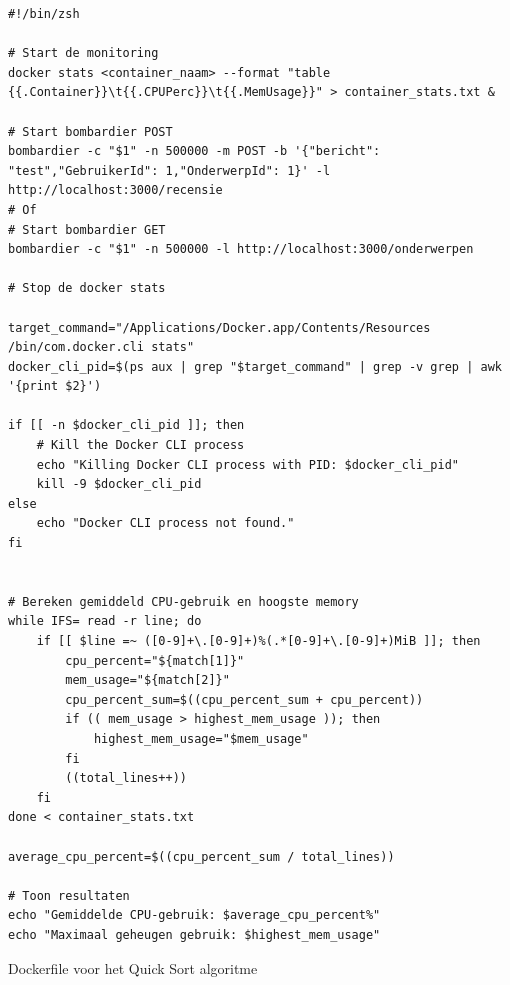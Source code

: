 \begin{listing}[H]
  \centering
  \begin{verbatim}
#!/bin/zsh

# Start de monitoring
docker stats <container_naam> --format "table {{.Container}}\t{{.CPUPerc}}\t{{.MemUsage}}" > container_stats.txt &

# Start bombardier POST
bombardier -c "$1" -n 500000 -m POST -b '{"bericht": "test","GebruikerId": 1,"OnderwerpId": 1}' -l http://localhost:3000/recensie
# Of
# Start bombardier GET
bombardier -c "$1" -n 500000 -l http://localhost:3000/onderwerpen

# Stop de docker stats

target_command="/Applications/Docker.app/Contents/Resources
/bin/com.docker.cli stats"
docker_cli_pid=$(ps aux | grep "$target_command" | grep -v grep | awk '{print $2}')

if [[ -n $docker_cli_pid ]]; then
    # Kill the Docker CLI process
    echo "Killing Docker CLI process with PID: $docker_cli_pid"
    kill -9 $docker_cli_pid
else
    echo "Docker CLI process not found."
fi


# Bereken gemiddeld CPU-gebruik en hoogste memory
while IFS= read -r line; do
    if [[ $line =~ ([0-9]+\.[0-9]+)%(.*[0-9]+\.[0-9]+)MiB ]]; then
        cpu_percent="${match[1]}"
        mem_usage="${match[2]}"
        cpu_percent_sum=$((cpu_percent_sum + cpu_percent))
        if (( mem_usage > highest_mem_usage )); then
            highest_mem_usage="$mem_usage"
        fi
        ((total_lines++))
    fi
done < container_stats.txt

average_cpu_percent=$((cpu_percent_sum / total_lines))

# Toon resultaten
echo "Gemiddelde CPU-gebruik: $average_cpu_percent%"
echo "Maximaal geheugen gebruik: $highest_mem_usage"

      \end{verbatim}
      \caption{\label{code:zshscript}Dockerfile voor het Quick Sort algoritme}
\end{listing}

